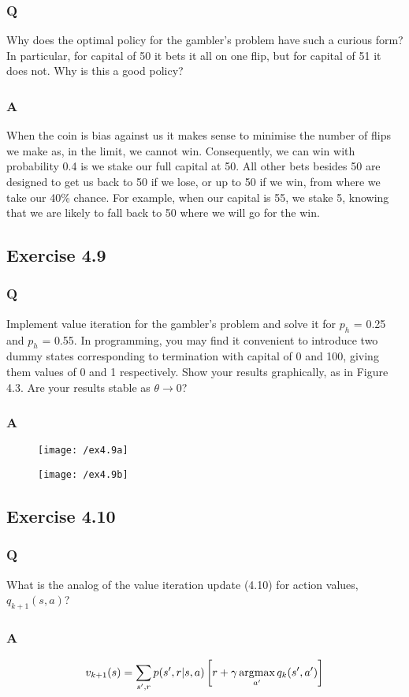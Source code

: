 \subsubsection{Q} Why does the optimal policy for the gambler’s problem have such a curious form? In particular, for capital of 50 it bets it all on one flip, but for capital of 51 it does not. Why is this a good policy?
\subsubsection{A}
When the coin is bias against us it makes sense to minimise the number of flips we make as, in the limit, we cannot win. Consequently, we can win with probability 0.4 is we stake our full capital at 50. All other bets besides 50 are designed to get us back to 50 if we lose, or up to 50 if we win, from where we take our 40\% chance. For example, when our capital is 55, we stake 5, knowing that we are likely to fall back to 50 where we will go for the win.

\subsection*{Exercise 4.9}
\subsubsection{Q} Implement value iteration for the gambler’s problem and solve it for $p_h$ = 0.25 and $p_h$ = 0.55. In programming, you may find it convenient to introduce two dummy states corresponding to termination with capital of 0 and 100, giving them values of 0 and 1 respectively. Show your results graphically, as in Figure 4.3. Are your results stable as $\theta \rightarrow 0$?
\subsubsection{A}
\ProgrammingExercise

\begin{figure}[h!]
	\centering
	\texttt{[image: /ex4.9a]}
	\label{fig:4.9a}
\end{figure}

\begin{figure}[h!]
	\centering
	\texttt{[image: /ex4.9b]}
	\label{fig:4.9b}
\end{figure}

\subsection*{Exercise 4.10}
\subsubsection{Q} What is the analog of the value iteration update (4.10) for action values, $q_{k+1}(s, a)$?
\subsubsection{A}
\begin{equation}
v_{k+1}(s) =  \sum_{s',r} p(s', r |s, a)\left[r + \gamma \operatorname*{\arg\!\max}_{a'} q_k(s', a')\right]
\end{equation}

